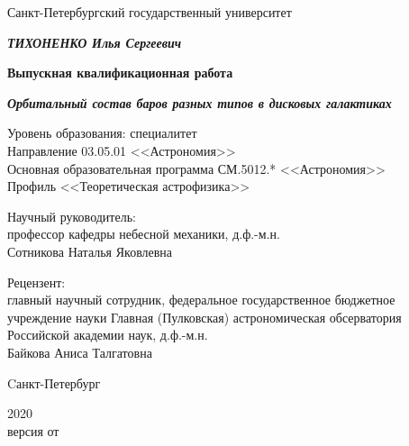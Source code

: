 \begin{titlepage}
  \centering
  {Санкт-Петербургский государственный университет \par}
  
  \vspace{1.5cm}

  {\bfseries \itshape\MakeUppercase{Тихоненко} Илья Сергеевич\par}
  \vspace{0.5\baselineskip}
  {\bfseries Выпускная квалификационная работа\par}
  \vspace{0.5\baselineskip}
  {\bfseries \itshape Орбитальный состав баров разных типов в дисковых галактиках\par}
  \vspace{1cm}
  {
    Уровень образования: специалитет\\
    Направление 03.05.01 <<Астрономия>>\\
    Основная образовательная программа СМ.5012.* <<Астрономия>>\\
    Профиль <<Теоретическая астрофизика>>
  }
  \vspace{1cm}
  \begin{flushright}
    \parbox{0.5\textwidth}{
      {Научный руководитель:} \\
      профессор кафедры небесной механики, д.ф.-м.н.\\
      Сотникова Наталья Яковлевна
    }
  \end{flushright}
  \par
  \begin{flushright}
    \parbox{0.5\textwidth}{
    {Рецензент:} \\
      главный научный сотрудник,
      федеральное государственное бюджетное учреждение науки Главная (Пулковская) 
      астрономическая обсерватория Российской академии наук,
      д.ф.-м.н.\\
      Байкова Аниса Талгатовна
    }
  \end{flushright}
  
  \vfill
  
  {Cанкт-Петербург \par}
  {2020}\\
  {\small версия от }
  \vspace*{-\baselineskip}
\end{titlepage}
